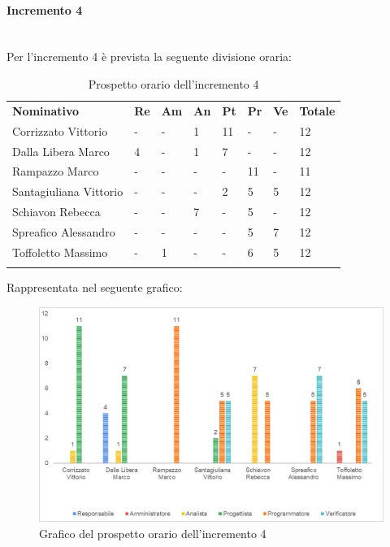 \paragraph{Incremento 4} \mbox{} \\
Per l'incremento 4 è prevista la seguente divisione oraria:
\begin{longtable} {				
		>{}p{40mm}  
		>{}p{8mm}
		>{}p{8mm}
		>{}p{8mm}
		>{}p{8mm}
		>{}p{8mm}
		>{}p{8mm}
		>{}p{12mm}				
	}			
	\rowcolor{gray!50}
	\textbf{Nominativo} & \textbf{Re} & \textbf{Am} & \textbf{An} & \textbf{Pt} & \textbf{Pr} & \textbf{Ve} & \textbf{Totale}	\TBstrut \\ [2mm]
	Corrizzato Vittorio & - & - & 1 & 11 & - & - & 12 \TBstrut \\ [2mm]
	Dalla Libera Marco & 4 & - & 1 & 7 & - & - & 12 \TBstrut \\ [2mm]
	Rampazzo Marco & - & - & - & - & 11 & - & 11 \TBstrut \\ [2mm]
	Santagiuliana Vittorio & - & - & - & 2 & 5 & 5 & 12 \TBstrut \\ [2mm]
	Schiavon Rebecca & - & - & 7 & - & 5 & - & 12 \TBstrut \\ [2mm]
	Spreafico Alessandro & - & - & - & - & 5 & 7 & 12 \TBstrut \\ [2mm]
	Toffoletto Massimo & - & 1 & - & - & 6 & 5 & 12 \TBstrut \\ [2mm]
	\rowcolor{white}
	\caption{Prospetto orario dell'incremento 4}
\end{longtable}
Rappresentata nel seguente grafico: \mbox{}
\begin{figure} [H]
	\includegraphics[width=\linewidth]{./img/Grafici/18.png}
	\caption{Grafico del prospetto orario dell'incremento 4}
\end{figure}
